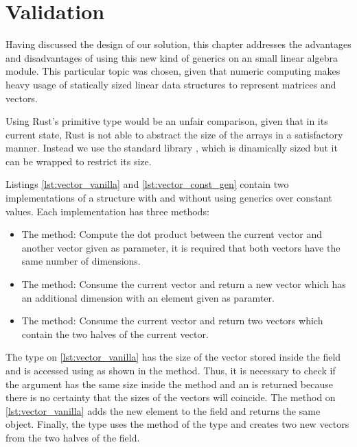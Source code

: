 \chapter{Validation}
\label{chap:validation}

Having discussed the design of our solution, this chapter addresses the
advantages and disadvantages of using this new kind of generics on an small
linear algebra module. This particular topic was chosen, given that numeric
computing makes heavy usage of statically sized linear data structures to
represent matrices and vectors.

Using Rust's  primitive type would be an unfair comparison,
given that in its current state, Rust is not able to abstract the size of the
arrays in a satisfactory manner. Instead we use the standard library
, which is dinamically sized but it can be wrapped to restrict its
size.

Listings \ref{lst:vector_vanilla} and \ref{lst:vector_const_gen} contain two
implementations of a  structure with and without using generics
over constant values. Each implementation has three methods:

\begin{itemize}
    \item The  method: Compute the dot product between the current
        vector and another vector given as parameter, it is required that both
        vectors have the same number of dimensions.  
    \item The  method: Consume the current vector and return a
        new vector which has an additional dimension with an element given as
        paramter.  
    \item The  method: Consume the current vector and return two
        vectors which contain the two halves of the current vector.  
\end{itemize}

The  type on \ref{lst:vector_vanilla} has the size of the vector
stored inside the  field and is accessed using
 as shown in the  method. Thus, it is
necessary to check if the  argument has the same size inside the
 method and an  is returned because there is no
certainty that the sizes of the vectors will coincide. The 
method on \ref{lst:vector_vanilla} adds the new element to the 
field and returns the same object. Finally, the  type uses the
method  of the  type and creates two new vectors
from the two halves of the  field.


